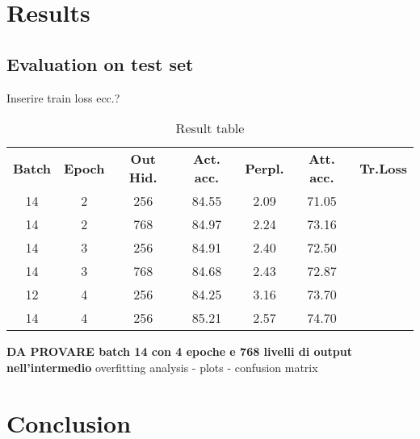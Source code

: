 \documentclass[final]{cvpr}
\begin{document}
	\section{Results}
	
	\subsection{Evaluation on test set}
	Inserire train loss ecc.?
	
	\begin{table}[h]
		\centering
	
		\begin{tabular}{ccccccc}
			\rowcolor[gray]{0.5}
			\textbf{Batch} & \textbf{Epoch} & \textbf{Out Hid.} & \textbf{Act. acc.} & \textbf{Perpl.} & \textbf{Att. acc.} & \textbf{Tr.Loss} \\
			\rowcolor[gray]{0.9}
			14 & 2 & 256 & 84.55 & 2.09 & 71.05 & \\
			\rowcolor[gray]{0.97}
			14 & 2 & 768 & 84.97 & 2.24 & 73.16 & \\
			\rowcolor[gray]{0.9}
			14 & 3 & 256 & 84.91 & 2.40 & 72.50 & \\
			\rowcolor[gray]{0.97}
			14 & 3 & 768 & 84.68 & 2.43 & 72.87 & \\
			\rowcolor[gray]{0.9}
			12 & 4 & 256 & 84.25 & 3.16 & 73.70 & \\
			\rowcolor[gray]{0.97}
			14 & 4 & 256 & 85.21 & 2.57 & 74.70 & \\
		\end{tabular}
	
		\caption{\small{Result table}}
		\label{tab:bencheval01}
	\end{table}

	\textbf{DA PROVARE batch 14 con 4 epoche e 768 livelli di output nell'intermedio} \newline
	overfitting analysis - plots - confusion matrix
	\section{Conclusion}
	
	
	{\small
		
		
	}
	
\end{document}
